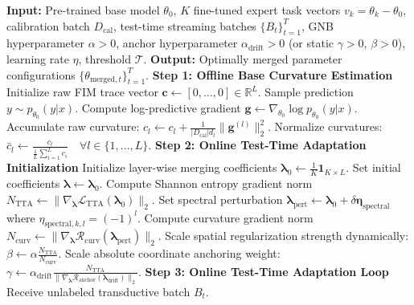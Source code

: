 \begin{algorithm}[tb]
\caption{Riemannian Curvature-Regularized Test-Time Model Merging (RCR-Merge)}
\label{alg:rcr_merge}
\begin{algorithmic}[1]
\STATE \textbf{Input:} Pre-trained base model $\theta_0$, $K$ fine-tuned expert task vectors $v_k = \theta_k - \theta_0$, calibration batch $D_{\text{cal}}$, test-time streaming batches $\{B_t\}_{t=1}^T$, GNB hyperparameter $\alpha > 0$, anchor hyperparameter $\alpha_{\text{drift}} > 0$ (or static $\gamma > 0$, $\beta > 0$), learning rate $\eta$, threshold $\mathcal{T}$.
\STATE \textbf{Output:} Optimally merged parameter configurations $\{\theta_{\text{merged}, t}\}_{t=1}^T$.
\STATE \textbf{Step 1: Offline Base Curvature Estimation}
\STATE Initialize raw FIM trace vector $\mathbf{c} \gets [0, \dots, 0] \in \mathbb{R}^L$.
    \STATE Sample prediction $y \sim p_{\theta_0}(y|x)$.
    \STATE Compute log-predictive gradient $\mathbf{g} \gets \nabla_{\theta_0} \log p_{\theta_0}(y|x)$.
        \STATE Accumulate raw curvature: $c_l \gets c_l + \frac{1}{|D_{\text{cal}}| d_l} \|\mathbf{g}^{(l)}\|_2^2$.
    \ENDFOR
\ENDFOR
\STATE Normalize curvatures: $\bar{c}_l \gets \frac{c_l}{\frac{1}{L} \sum_{i=1}^L c_i} \quad \forall l \in \{1, \dots, L\}$.
\STATE \textbf{Step 2: Online Test-Time Adaptation Initialization}
\STATE Initialize layer-wise merging coefficients $\boldsymbol{\lambda}_0 \gets \frac{1}{K} \mathbf{1}_{K \times L}$.
\STATE Set initial coefficients $\boldsymbol{\lambda} \gets \boldsymbol{\lambda}_0$.
\STATE Compute Shannon entropy gradient norm $N_{\text{TTA}} \gets \|\nabla_{\boldsymbol{\lambda}} \mathcal{L}_{\text{TTA}}(\boldsymbol{\lambda}_0)\|_2$.
\STATE Set spectral perturbation $\boldsymbol{\lambda}_{\text{pert}} \gets \boldsymbol{\lambda}_0 + \delta \boldsymbol{\eta}_{\text{spectral}}$ where $\eta_{\text{spectral}, k, l} = (-1)^l$.
\STATE Compute curvature gradient norm $N_{\text{curv}} \gets \|\nabla_{\boldsymbol{\lambda}} \mathcal{R}_{\text{curv}}(\boldsymbol{\lambda}_{\text{pert}})\|_2$.
\STATE Scale spatial regularization strength dynamically: $\beta \gets \alpha \frac{N_{\text{TTA}}}{N_{\text{curv}}}$.
\STATE Scale absolute coordinate anchoring weight: $\gamma \gets \alpha_{\text{drift}} \frac{N_{\text{TTA}}}{\|\nabla_{\boldsymbol{\lambda}} \mathcal{R}_{\text{anchor}}(\boldsymbol{\lambda}_{\text{drift}})\|_2}$.
\STATE \textbf{Step 3: Online Test-Time Adaptation Loop}
    \STATE Receive unlabeled transductive batch $B_t$.

\end{algorithmic}
\end{algorithm}

